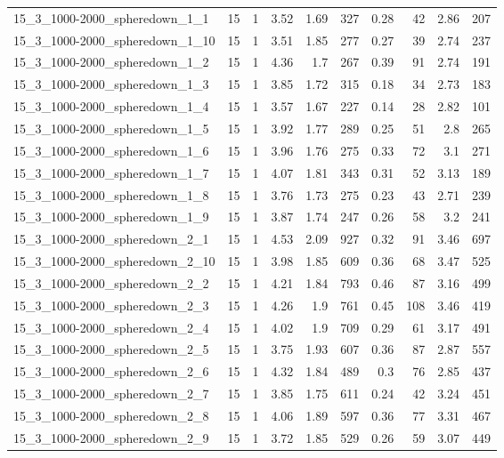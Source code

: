 \begin{center}
\begin{scriptsize}
\begin{longtable}{lrrrrrrrrr}
15\_3\_1000-2000\_spheredown\_1\_1 & 15 & 1 & 3.52 & 1.69 & 327 & 0.28 & 42 & 2.86 & 207\\
15\_3\_1000-2000\_spheredown\_1\_10 & 15 & 1 & 3.51 & 1.85 & 277 & 0.27 & 39 & 2.74 & 237\\
15\_3\_1000-2000\_spheredown\_1\_2 & 15 & 1 & 4.36 & 1.7 & 267 & 0.39 & 91 & 2.74 & 191\\
15\_3\_1000-2000\_spheredown\_1\_3 & 15 & 1 & 3.85 & 1.72 & 315 & 0.18 & 34 & 2.73 & 183\\
15\_3\_1000-2000\_spheredown\_1\_4 & 15 & 1 & 3.57 & 1.67 & 227 & 0.14 & 28 & 2.82 & 101\\
15\_3\_1000-2000\_spheredown\_1\_5 & 15 & 1 & 3.92 & 1.77 & 289 & 0.25 & 51 & 2.8 & 265\\
15\_3\_1000-2000\_spheredown\_1\_6 & 15 & 1 & 3.96 & 1.76 & 275 & 0.33 & 72 & 3.1 & 271\\
15\_3\_1000-2000\_spheredown\_1\_7 & 15 & 1 & 4.07 & 1.81 & 343 & 0.31 & 52 & 3.13 & 189\\
15\_3\_1000-2000\_spheredown\_1\_8 & 15 & 1 & 3.76 & 1.73 & 275 & 0.23 & 43 & 2.71 & 239\\
15\_3\_1000-2000\_spheredown\_1\_9 & 15 & 1 & 3.87 & 1.74 & 247 & 0.26 & 58 & 3.2 & 241\\
15\_3\_1000-2000\_spheredown\_2\_1 & 15 & 1 & 4.53 & 2.09 & 927 & 0.32 & 91 & 3.46 & 697\\
15\_3\_1000-2000\_spheredown\_2\_10 & 15 & 1 & 3.98 & 1.85 & 609 & 0.36 & 68 & 3.47 & 525\\
15\_3\_1000-2000\_spheredown\_2\_2 & 15 & 1 & 4.21 & 1.84 & 793 & 0.46 & 87 & 3.16 & 499\\
15\_3\_1000-2000\_spheredown\_2\_3 & 15 & 1 & 4.26 & 1.9 & 761 & 0.45 & 108 & 3.46 & 419\\
15\_3\_1000-2000\_spheredown\_2\_4 & 15 & 1 & 4.02 & 1.9 & 709 & 0.29 & 61 & 3.17 & 491\\
15\_3\_1000-2000\_spheredown\_2\_5 & 15 & 1 & 3.75 & 1.93 & 607 & 0.36 & 87 & 2.87 & 557\\
15\_3\_1000-2000\_spheredown\_2\_6 & 15 & 1 & 4.32 & 1.84 & 489 & 0.3 & 76 & 2.85 & 437\\
15\_3\_1000-2000\_spheredown\_2\_7 & 15 & 1 & 3.85 & 1.75 & 611 & 0.24 & 42 & 3.24 & 451\\
15\_3\_1000-2000\_spheredown\_2\_8 & 15 & 1 & 4.06 & 1.89 & 597 & 0.36 & 77 & 3.31 & 467\\
15\_3\_1000-2000\_spheredown\_2\_9 & 15 & 1 & 3.72 & 1.85 & 529 & 0.26 & 59 & 3.07 & 449\\

\end{longtable}
\end{scriptsize}
\end{center}
